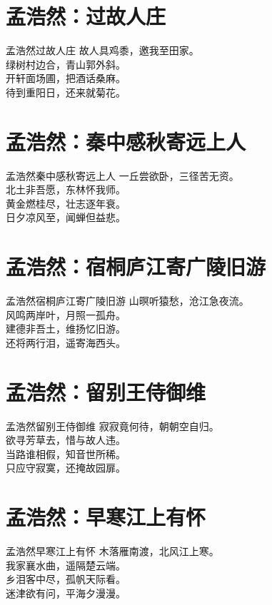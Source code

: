 \documentclass[12pt,oneside,a5paper]{book}
\begin{document}
\chapter{孟浩然：过故人庄}
\begin{poemzh}{孟浩然}{过故人庄}
故人具鸡黍，邀我至田家。\\
绿树村边合，青山郭外斜。\\
开轩面场圃，把酒话桑麻。\\
待到重阳日，还来就菊花。\\ 
\end{poemzh}

\chapter{孟浩然：秦中感秋寄远上人}
\begin{poemzh}{孟浩然}{秦中感秋寄远上人}
一丘尝欲卧，三径苦无资。\\
北土非吾愿，东林怀我师。\\
黄金燃桂尽，壮志逐年衰。\\
日夕凉风至，闻蝉但益悲。\\ 
\end{poemzh}

\chapter{孟浩然：宿桐庐江寄广陵旧游}
\begin{poemzh}{孟浩然}{宿桐庐江寄广陵旧游}
山暝听猿愁，沧江急夜流。\\
风鸣两岸叶，月照一孤舟。\\
建德非吾土，维扬忆旧游。\\
还将两行泪，遥寄海西头。\\ 
\end{poemzh}

\chapter{孟浩然：留别王侍御维}
\begin{poemzh}{孟浩然}{留别王侍御维}
寂寂竟何待，朝朝空自归。\\
欲寻芳草去，惜与故人违。\\
当路谁相假，知音世所稀。\\
只应守寂寞，还掩故园扉。\\ 
\end{poemzh}

\chapter{孟浩然：早寒江上有怀}
\begin{poemzh}{孟浩然}{早寒江上有怀}
木落雁南渡，北风江上寒。\\
我家襄水曲，遥隔楚云端。\\
乡泪客中尽，孤帆天际看。\\
迷津欲有问，平海夕漫漫。\\ 
\end{poemzh}
\end{document}

